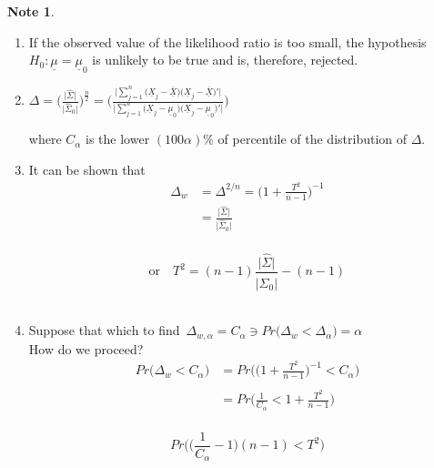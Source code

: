 \documentclass[11pt,a4paper]{article}
\theoremstyle{definition}
\newtheorem{note}[thm]{Note}
\begin{document}
\pagebreak
\begin{note}
\begin{enumerate}
\item If the observed value of the likelihood ratio is too small, the hypothesis $H_0: \underline{\mu} = \underline{\mu}_0$ is unlikely to be true and is, therefore, rejected.

\item $\displaystyle{\Delta = \Bigg(\frac{\big|\widehat{\Sigma}\big|}{\big|\widehat{\Sigma}_0\big|}\Bigg)^{\frac{n}{2}}=\Bigg(\frac{\Big|\sum\limits_{j=1}^n\big(\underline{X}_j-\overline{\underline{X}}\big)\big(\underline{X}_j-\overline{\underline{X}}\big)'\Big|}{\Big|\sum\limits_{j=1}^n\big(\underline{X}_j-\underline{\mu}_0\big)\big(\underline{X}_j-\underline{\mu}_0\big)'\Big|}\Bigg)}$

where $C_{\alpha}$ is the lower $(100\alpha)\%$ of percentile of the distribution of $\Delta$.





\item It can be shown that 
\begin{align*}
\Delta_w & = \Delta^{2/n}= \Bigg(1 + \frac{T^2}{n-1}\Bigg)^{-1}\\
& = \frac{\big|\widehat{\Sigma}\big|}{\big|\widehat{\Sigma}_0\big|}\\
\end{align*}


\begin{equation}\tag{7}
\text{or}\quad  T^2 = (n-1)\frac{\big|\widehat{\Sigma}\big|}{\big|\widehat{\Sigma}_0\big|}-(n-1)
\end{equation}\\



\item Suppose that which to find \,$\displaystyle{ \Delta_{w,\alpha} = C_{\alpha} \ni Pr\big(\Delta_w < \Delta_{\alpha}\big) = \alpha}$\\

How do we proceed?
\begin{align*}
Pr\big(\Delta_w<C_{\alpha}\big) & = Pr\Bigg(\Bigg(1 + \frac{T^2}{n-1}\Bigg)^{-1}<C_{\alpha}\Bigg)\\\\
                                & = Pr\Bigg(\frac{1}{C_{\alpha}}<1 + \frac{T^2}{n-1}\Bigg)\\
\end{align*}


$$Pr\Bigg(\Bigg(\frac{1}{C_{\alpha}}-1\Bigg)(n-1)<T^2\Bigg)$$\\




\end{enumerate}
\end{note}
\end{document}
